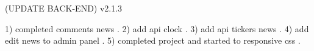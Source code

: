 (UPDATE BACK-END) v2.1.3

1) completed comments news .
2) add api clock .
3) add api tickers news .
4) add edit news to admin panel .
5) completed project and started to responsive css .
